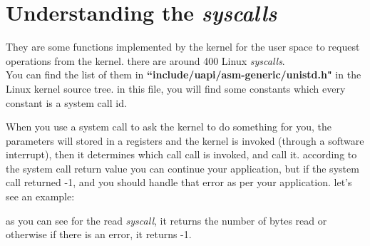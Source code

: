 \documentclass{article}
\begin{document}
\section{Understanding the \textit{syscalls}}
They are some functions implemented by the kernel for the user space to request operations from the kernel. there are around 400 Linux \textit{syscalls}.\\
You can find the list of them in \textbf{``include/uapi/asm-generic/unistd.h"} in the Linux kernel source tree. in this file, you will find some constants which every constant is a system call id.

When you use a system call to ask the kernel to do something for you, the parameters will stored in a registers and the kernel is invoked (through a software interrupt), then it determines which call call is invoked, and call it.
according to the system call return value you can continue your application, but if the system call returned -1, and you should handle that error as per your application. let's see an example:



as you can see for the read \textit{syscall}, it returns the number of bytes read or otherwise if there is an error, it returns -1.\\
\end{document}
